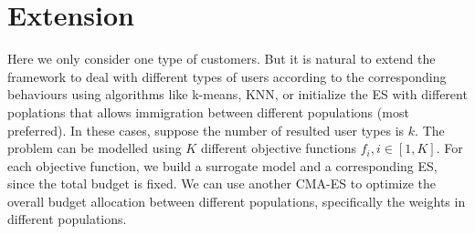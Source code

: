 \documentclass{article}
\begin{document}
\section{Extension}
Here we only consider one type of customers. But it is natural to extend the framework to deal with different types of users according to the corresponding behaviours using algorithms like k-means, KNN, or initialize the ES with different poplations that allows immigration between different populations (most preferred). In these cases, suppose the number of resulted user types is $k$.  The problem can be modelled using $K$ different objective functions $f_i,i\in[1,K]$. For each objective function, we build a surrogate model and a corresponding ES, since the total budget is fixed. We can use another CMA-ES to optimize the overall budget allocation between different populations, specifically the weights in different populations. 




\end{document}
